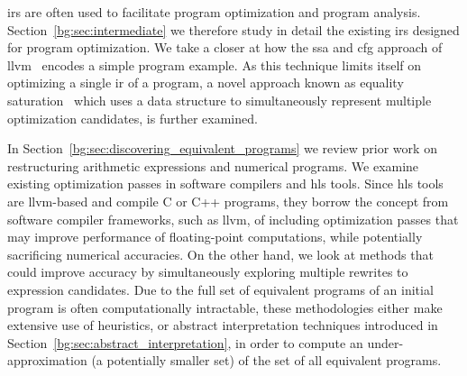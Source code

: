 \Glspl{ir} are often used to facilitate program optimization and program
analysis.  Section~\ref{bg:sec:intermediate} we therefore study in detail
the existing \glspl{ir} designed for program optimization.  We take a closer
at how the \gls{ssa} and \gls{cfg} approach of \gls{llvm}~\cite{llvm_ir}
encodes a simple program example.  As this technique limits itself on
optimizing a single \gls{ir} of a program, a novel approach known as equality
saturation~\cite{tate09} which uses a data structure to simultaneously
represent multiple optimization candidates, is further examined.

In Section~\ref{bg:sec:discovering_equivalent_programs} we review prior
work on restructuring arithmetic expressions and numerical programs.  We
examine existing optimization passes in software compilers and \gls{hls}
tools.  Since \gls{hls} tools are \gls{llvm}-based and compile C or C++
programs, they borrow the concept from software compiler frameworks, such as
\gls{llvm}, of including optimization passes that may improve performance
of floating-point computations, while potentially sacrificing numerical
accuracies.  On the other hand, we look at methods that could improve accuracy
by simultaneously exploring multiple rewrites to expression candidates.
Due to the full set of equivalent programs of an initial program is often
computationally intractable, these methodologies either make extensive
use of heuristics, or abstract interpretation techniques introduced in
Section~\ref{bg:sec:abstract_interpretation}, in order to compute an
under-approximation (a potentially smaller set) of the set of all equivalent
programs.

